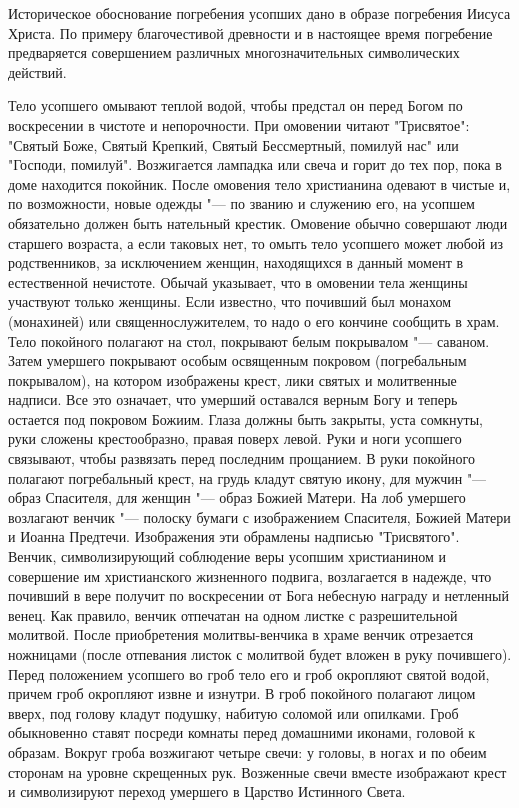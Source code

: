 Историческое обоснование погребения усопших дано в образе погребения Иисуса Христа. По примеру благочестивой древности и в настоящее время погребение предваряется совершением различных многозначительных символических действий. 

Тело усопшего омывают теплой водой, чтобы предстал он перед Богом по воскресении в чистоте и непорочности. При омовении читают "Трисвятое": "Святый Боже, Святый Крепкий, Святый Бессмертный, помилуй нас" или "Господи, помилуй". Возжигается лампадка или свеча и горит до тех пор, пока в доме находится покойник. После омовения тело христианина одевают в чистые и, по возможности, новые одежды "--- по званию и служению его, на усопшем обязательно должен быть нательный крестик. Омовение обычно совершают люди старшего возраста, а если таковых нет, то омыть тело усопшего может любой из родственников, за исключением женщин, находящихся в данный момент в естественной нечистоте. Обычай указывает, что в омовении тела женщины участвуют только женщины. Если известно, что почивший был монахом (монахиней) или священнослужителем, то надо о его кончине сообщить в храм. Тело покойного полагают на стол, покрывают белым покрывалом "--- саваном. Затем умершего покрывают особым освященным покровом (погребальным покрывалом), на котором изображены крест, лики святых и молитвенные надписи. Все это означает, что умерший оставался верным Богу и теперь остается под покровом Божиим. Глаза должны быть закрыты, уста сомкнуты, руки сложены крестообразно, правая поверх левой. Руки и ноги усопшего связывают, чтобы развязать перед последним прощанием. В руки покойного полагают погребальный крест, на грудь кладут святую икону, для мужчин "--- образ Спасителя, для женщин "--- образ Божией Матери. На лоб умершего возлагают венчик "--- полоску бумаги с изображением Спасителя, Божией Матери и Иоанна Предтечи. Изображения эти обрамлены надписью "Трисвятого". Венчик, символизирующий соблюдение веры усопшим христианином и совершение им христианского жизненного подвига, возлагается в надежде, что почивший в вере получит по воскресении от Бога небесную награду и нетленный венец. Как правило, венчик отпечатан на одном листке с разрешительной молитвой. После приобретения молитвы-венчика в храме венчик отрезается ножницами (после отпевания листок с молитвой будет вложен в руку почившего). Перед положением усопшего во гроб тело его и гроб окропляют святой водой, причем гроб окропляют извне и изнутри. В гроб покойного полагают лицом вверх, под голову кладут подушку, набитую соломой или опилками. Гроб обыкновенно ставят посреди комнаты перед домашними иконами, головой к образам. Вокруг гроба возжигают четыре свечи: у головы, в ногах и по обеим сторонам на уровне скрещенных рук. Возженные свечи вместе изображают крест и символизируют переход умершего в Царство Истинного Света. 

